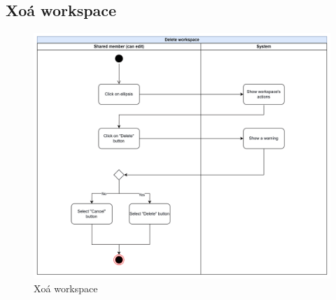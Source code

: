 \subsection{Xoá workspace}
    \begin{figure}[H]
        \centering
        \includegraphics[width=\linewidth]{Content/Phân tích và thiết kế hệ thống/documents/Sơ đồ hoạt động/images/deleteWorkspace.png}
        \vspace{0.5cm}
        \caption{Xoá workspace}
        \label{fig:Xoá workspace}
    \end{figure}